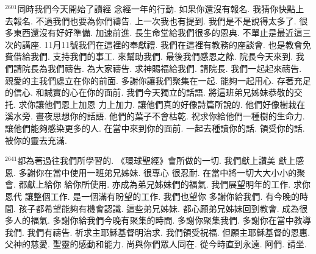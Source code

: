 \documentclass{book}
\begin{document}
$^{2601}$同時我們今天開始了讀經 念經一年的行動.
如果你還沒有報名.
我猜你快點上去報名.
不過我們也要為你們禱告.
上一次我也有提到.
我們是不是說得太多了.
很多東西還沒有好好準備.
加速前進.
長生命堂給我們很多的恩典.
不單止是最近這三次的講座.
11月11號我們在這裡的奉獻禮.
我們在這裡有教務的座談會.
也是教會免費借給我們.
支持我們的事工.
來幫助我們.
最後我們感恩之餘.
院長今天來到.
我們請院長為我們禱告.
為大家禱告.
求神賜福給我們.
請院長.
我們一起起來禱告.
親愛的主我們處立在你的前面.
多謝你讓我們聚集在一起.
能夠一起用心.
存著充足的信心.
和誠實的心在你的面前.
我們今天獨立的話語.
將這班弟兄姊妹恭敬的交托.
求你讓他們恩上加恩 力上加力.
讓他們真的好像詩篇所說的.
他們好像樹栽在溪水旁.
晝夜思想你的話語.
他們的葉子不會枯乾.
祝求你給他們一種樹的生命力.
讓他們能夠感染更多的人.
在當中來到你的面前.
一起去種讀你的話.
領受你的話.
被你的靈去充滿.

$^{2641}$都為著過往我們所學習的.
《環球聖經》會所做的一切.
我們獻上讚美 獻上感恩.
多謝你在當中使用一班弟兄姊妹.
很專心 很忍耐.
在當中將一切大大小小的聚會.
都獻上給你 給你所使用.
亦成為弟兄姊妹們的福氣.
我們展望明年的工作.
求你恩代 讓整個工作.
是一個滿有盼望的工作.
我們也望你 多謝你給我們.
有今晚的時間.
孩子都希望能夠有機會認識.
這些弟兄姊妹.
都心願弟兄姊妹回到教會.
成為很多人的福氣.
多謝你給我們今晚有聚集的時間.
多謝你聚集我們.
多謝你在當中教導我們.
我們有禱告.
祈求主耶穌基督明治求.
我們領受祝福.
但願主耶穌基督的恩惠.
父神的慈愛.
聖靈的感動和能力.
尚與你們眾人同在.
從今時直到永遠.
阿們.
請坐.
\newpage
\end{document}
